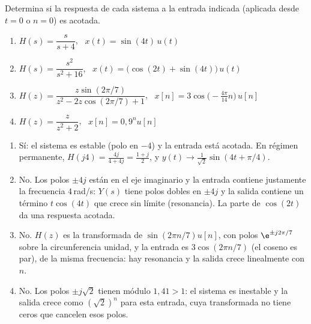 \documentclass[11pt,a4paper]{scrartcl}
\begin{document}
\begin{ejercicio}
  Determina si la respuesta de cada sistema a la entrada indicada (aplicada desde $t=0$ o $n=0$) es acotada.
  \begin{enumerate}[label=\alph*)]
    \item $H(s)=\dfrac{s}{s+4}$, \ $x(t)=\sin(4t)\,u(t)$
    \item $H(s)=\dfrac{s^2}{s^2+16}$, \ $x(t)=\big(\cos(2t)+\sin(4t)\big)\,u(t)$
    \item $H(z)=\dfrac{z\sin(2\pi/7)}{z^2-2z\cos(2\pi/7)+1}$, \ $x[n]=3\cos\big(-\tfrac{4\pi}{14}n\big)\,u[n]$
    \item $H(z)=\dfrac{z}{z^2+2}$, \ $x[n]=0{,}9^nu[n]$
  \end{enumerate}
\end{ejercicio}
\begin{solucion}
  \begin{enumerate}[label=\alph*)]
    \item Sí: el sistema es estable (polo en $-4$) y la entrada está acotada. En régimen permanente, $H(j4)=\frac{4j}{4+4j}=\frac{1+j}{2}$, y $y(t)\to\frac{1}{\sqrt2}\sin(4t+\pi/4)$.
    \item No. Los polos $\pm4j$ están en el eje imaginario y la entrada contiene justamente la frecuencia $4$\,rad/s: $Y(s)$ tiene polos dobles en $\pm4j$ y la salida contiene un término $t\cos(4t)$ que crece sin límite (resonancia). La parte de $\cos(2t)$ da una respuesta acotada.
    \item No. $H(z)$ es la transformada de $\sin(2\pi n/7)u[n]$, con polos $\e^{\pm j2\pi/7}$ sobre la circunferencia unidad, y la entrada es $3\cos(2\pi n/7)$ (el coseno es par), de la misma frecuencia: hay resonancia y la salida crece linealmente con $n$.
    \item No. Los polos $\pm j\sqrt2$ tienen módulo $1{,}41>1$: el sistema es inestable y la salida crece como $(\sqrt2)^n$ para esta entrada, cuya transformada no tiene ceros que cancelen esos polos.
  \end{enumerate}
\end{solucion}
\end{document}
